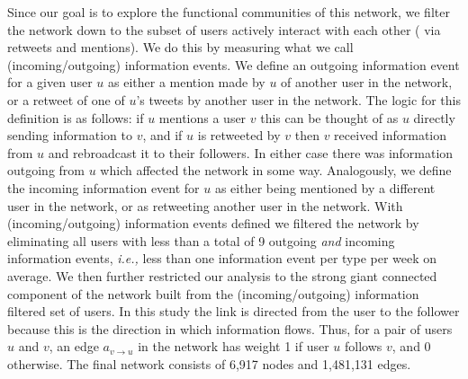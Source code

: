 Since our goal is to explore the functional communities of this network, we filter the network down to the subset of users \DIFdelbegin {}\DIFdelend \DIFaddbegin {}\DIFaddend actively interact with each other ( \DIFaddend via retweets and mentions). We do this by measuring what we call (incoming/outgoing) information events. We define an outgoing information event for a given user $u$ as either a mention made by $u$ of another user in the network, or a retweet of one of $u$'s tweets by another user in the network. The logic for this definition is as follows: if $u$ mentions a user $v$ this can be thought of as $u$ directly sending information to $v$, and if $u$ is retweeted by $v$ then $v$ received information from $u$ and rebroadcast it to their followers. In either case there was information outgoing from $u$ which affected the network in some way. Analogously, we define the incoming information event for $u$ as either being mentioned by a different user in the network, or as retweeting another user in the network.
With (incoming/outgoing) information events defined we filtered the network by eliminating all users with less than a total of 9 outgoing \emph{and} incoming information events, {\it i.e.,} less than one information event per type per week on average. 
We then further restricted our analysis to the strong giant connected component of the network built from the (incoming/outgoing) information filtered set of users. %
In this study the link is directed from the user to the follower because this is the direction in which information flows. Thus, for a pair of users $u$ and $v$, an edge $a_{v \to u}$ in the \DIFdelbegin {}\DIFdelend \DIFaddbegin {}\DIFaddend network has weight 1 if user $u$ follows $v$, and 0 otherwise. The final network consists of 6,917 nodes and 1,481,131 edges.

